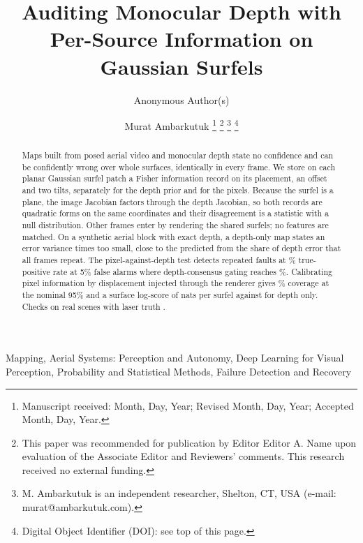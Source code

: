 \documentclass[letterpaper,journal,twoside]{IEEEtran}
\begin{document}
\title{Auditing Monocular Depth with Per-Source Information on Gaussian Surfels}

\ifanonymous
\author{Anonymous Author(s)}
\else
\author{Murat Ambarkutuk%
\thanks{Manuscript received: Month, Day, Year; Revised Month, Day, Year; Accepted Month, Day, Year.}%
\thanks{This paper was recommended for publication by Editor Editor A. Name upon evaluation of the
Associate Editor and Reviewers' comments. This research received no external funding.}%
\thanks{M. Ambarkutuk is an independent researcher, Shelton, CT, USA (e-mail: murat@ambarkutuk.com).}%
\thanks{Digital Object Identifier (DOI): see top of this page.}}
\fi

\maketitle

\begin{abstract}
Maps built from posed aerial video and monocular depth state no confidence and can be confidently wrong over
whole surfaces, identically in every frame. We store on each planar Gaussian surfel patch a Fisher
information record on its placement, an offset and two tilts, separately for the depth prior and for the
pixels. Because the surfel is a plane, the image Jacobian factors through the depth Jacobian, so both
records are quadratic forms on the same coordinates and their disagreement is a statistic with a null
distribution. Other frames enter by rendering the shared surfels; no features are matched. On a synthetic
aerial block with exact depth, a depth-only map states an error variance  times too small, close to
the  predicted from the share of depth error that all frames repeat. The pixel-against-depth test
detects repeated faults at \% true-positive rate at 5\% false alarms where depth-consensus gating
reaches \%. Calibrating pixel information by displacement injected through the renderer gives
\% coverage at the nominal 95\% and a surface log-score of  nats per surfel against  for
depth only. Checks on  real scenes with laser truth .
\end{abstract}

\begin{IEEEkeywords}
Mapping, Aerial Systems: Perception and Autonomy, Deep Learning for Visual Perception,
Probability and Statistical Methods, Failure Detection and Recovery
\end{IEEEkeywords}
\end{document}
